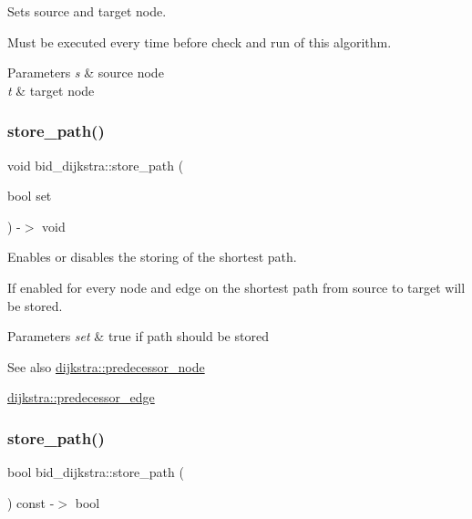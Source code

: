 Sets source and target node. 

Must be executed every time before check and run of this algorithm.


\begin{DoxyParams}{Parameters}
{\em s} & source node \\
\hline
{\em t} & target node \\
\hline
\end{DoxyParams}
\mbox{\label{classbid__dijkstra_aa095beede9c50b1f1e482049a2a4b619}} 
\subsubsection{\texorpdfstring{store\+\_\+path()}{store\_path()}\hspace{0.1cm}{\footnotesize\ttfamily [1/2]}}
{\footnotesize\ttfamily void bid\+\_\+dijkstra\+::store\+\_\+path (\begin{DoxyParamCaption}\item[{bool}]{set }\end{DoxyParamCaption}) -\/$>$ void}



Enables or disables the storing of the shortest path. 

If enabled for every node and edge on the shortest path from source to target will be stored.


\begin{DoxyParams}{Parameters}
{\em set} & true if path should be stored\\
\hline
\end{DoxyParams}
\begin{DoxySeeAlso}{See also}
\mbox{\hyperlink{classdijkstra_a99c17ee7c2b55574ea8c2952fac09faf}{dijkstra\+::predecessor\+\_\+node}} 

\mbox{\hyperlink{classdijkstra_aa3ef1a7d7dfc33e4a39aff309f873929}{dijkstra\+::predecessor\+\_\+edge}} 
\end{DoxySeeAlso}
\mbox{\label{classbid__dijkstra_abc92453ccade60d676bf2074c7fb0493}} 
\subsubsection{\texorpdfstring{store\+\_\+path()}{store\_path()}\hspace{0.1cm}{\footnotesize\ttfamily [2/2]}}
{\footnotesize\ttfamily bool bid\+\_\+dijkstra\+::store\+\_\+path (\begin{DoxyParamCaption}{ }\end{DoxyParamCaption}) const -\/$>$ bool}



